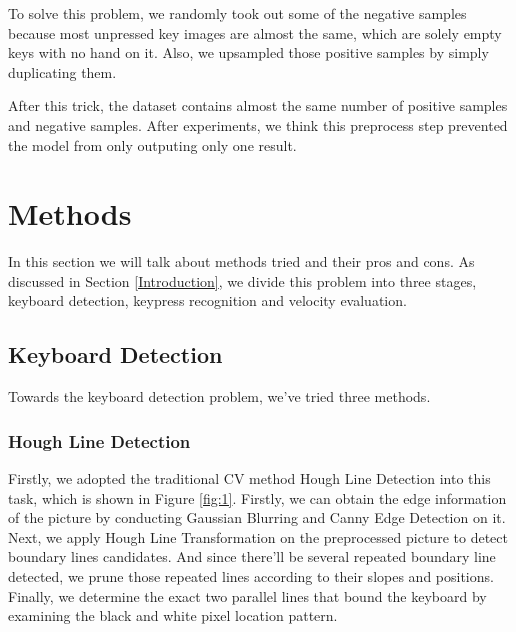 \documentclass[10pt,twocolumn,letterpaper]{article}
\begin{document}
To solve this problem, we randomly took out some of the negative samples because most unpressed key images are almost the same, which are solely empty keys with no hand on it. Also, we upsampled those positive samples by simply duplicating them.

After this trick, the dataset contains almost the same number of positive samples and negative samples. After experiments, we think this preprocess step prevented the model from only outputing only one result.


\section{Methods}

In this section we will talk about methods tried and their pros and cons. 
As discussed in Section \ref{Introduction}, we divide this problem into three stages, keyboard detection, keypress recognition and velocity evaluation.

\subsection{Keyboard Detection} \label{keyboarddetection}
\label{Keyboard}

Towards the keyboard detection problem, we've tried three methods. 

\subsubsection{Hough Line Detection}
Firstly, we adopted the traditional CV method Hough Line Detection into this task, which is shown in Figure \ref{fig:1}. 
Firstly, we can obtain the edge information of the picture by conducting Gaussian Blurring and Canny Edge Detection on it.
Next, we apply Hough Line Transformation \cite{Hough} on the preprocessed picture to detect boundary lines candidates. 
And since there'll be several repeated boundary line detected, we prune those repeated lines according to their slopes and positions.
Finally, we determine the exact two parallel lines that bound the keyboard by examining the black and white pixel location pattern. 
\end{document}
